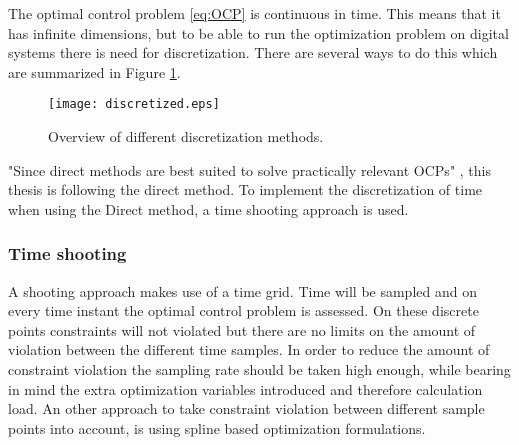 The optimal control problem \ref{eq:OCP} is continuous in time. This means that it has infinite dimensions, but to be able to run the optimization problem on digital systems there is need for discretization. There are several ways to do this which are summarized in Figure \ref{fig:discretization_m}.\cite{Gillis2019}
\begin{figure}[htp]
	\centering
	\texttt{[image: discretized.eps]}
	\caption{Overview of different discretization methods.}
	\label{fig:discretization_m}
\end{figure}

"Since direct methods are best suited to solve practically relevant OCPs" \cite{Mercy2018}, this thesis is following the direct method. To implement the discretization of time when using the Direct method, a time shooting approach is used.

\subsubsection{Time shooting}
A shooting approach makes use of a time grid. Time will be sampled and on every time instant the optimal control problem is assessed. On these discrete points constraints will not violated but there are no limits on the amount of violation between the different time samples. In order to reduce the amount of constraint violation the sampling rate should be taken high enough, while bearing in mind the extra optimization variables introduced and therefore calculation load. An other approach to take constraint violation between different sample points into account, is using spline based optimization formulations. \cite{Mercy2018}\\

